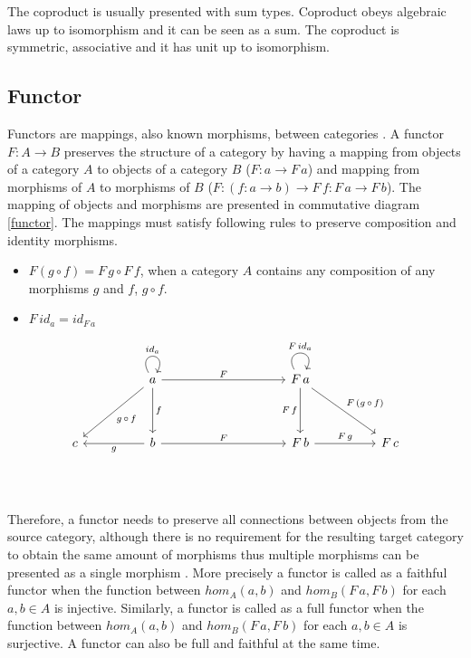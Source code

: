 \documentclass[article]{aaltoseries}
\begin{document}
    The coproduct is usually presented with sum types. Coproduct obeys algebraic
    laws up to isomorphism and it can be seen as a sum. The coproduct is
    symmetric, associative and it has unit up to isomorphism.
    

  \subsection{Functor}
    Functors are mappings, also known morphisms, between categories
    \cite{computational, barr1990category, mac2013categories}. A functor $F: A
    \rightarrow B$ preserves the structure of a category by having a mapping
    from objects of a category $A$ to objects of a category $B$ ($F: a
    \rightarrow F\, a$) and mapping from morphisms of $A$ to morphisms of $B$
    ($F: (f: a \rightarrow b) \rightarrow F\, f: F\, a \rightarrow F\, b$). The
    mapping of objects and morphisms are presented in commutative diagram
    \ref{functor}. The mappings must satisfy following rules to preserve
    composition and identity morphisms.

    \begin{itemize}
      \item $F(g \circ f) = F\, g \circ F\, f$, when a category $A$ contains any
        composition of any morphisms $g$ and $f$, $g \circ f$.
      \item $F\, id_a = id_{F\, a}$
    \end{itemize}

    \begin{equation}
      \label{functor}
      \begin{tikzcd}[row sep=huge, column sep=huge]
        & a \arrow[d, "f"] \arrow[dl, "g\, \circ\, f"] \arrow[r, "F"] \arrow[loop, distance=2em, in=60, out=120, "id_a"]
        &[5em] F\, a \arrow[d, "F\, f"'] \arrow[dr, "F\, (g\, \circ\, f)"]
                   \arrow[loop, distance=2em, in=60, out=120, "F\, id_a"]
        & \\
        c
        & b \arrow[l, "g"] \arrow[r, "F"]
        & F\, b \arrow[r, "F\, g"]
        & F\, c \\
      \end{tikzcd}
    \end{equation}

    Therefore, a functor needs to preserve all connections between objects from
    the source category, although there is no requirement for the resulting
    target category to obtain the same amount of morphisms thus multiple
    morphisms can be presented as a single morphism \cite{computational,
      barr1990category}. More precisely a functor is called as a faithful
    functor when the function between $hom_A(a, b)$ and $hom_B(F\, a, F\, b)$ for
    each $a, b \in A$ is injective. Similarly, a functor is called as a full
    functor when the function between $hom_A(a, b)$ and $hom_B(F\, a, F\, b)$ for
    each $a, b \in A$ is surjective. A functor can also be full and faithful at
    the same time.
 
\end{document}

